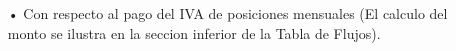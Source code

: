 \begin{enumerate}
\begin{enumerate}
\item[•]Con respecto al pago del IVA de posiciones mensuales (El calculo del monto se ilustra en la seccion inferior de la Tabla de Flujos).

\end{enumerate}



%


%
%
%
%





\end{enumerate}